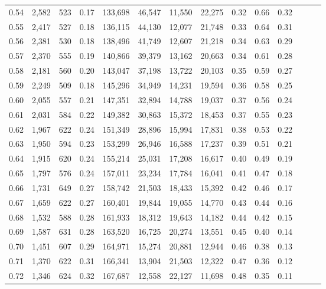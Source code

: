 \begin{tabular}{rrrrrrrrrrrrrr}
0.54 &  2,582 &  523 &  0.17 &  133,698 &   46,547 &  11,550 &  22,275 &  0.32 &  0.66 &      0.32 \\
0.55 &  2,417 &  527 &  0.18 &  136,115 &   44,130 &  12,077 &  21,748 &  0.33 &  0.64 &      0.31 \\
0.56 &  2,381 &  530 &  0.18 &  138,496 &   41,749 &  12,607 &  21,218 &  0.34 &  0.63 &      0.29 \\
0.57 &  2,370 &  555 &  0.19 &  140,866 &   39,379 &  13,162 &  20,663 &  0.34 &  0.61 &      0.28 \\
0.58 &  2,181 &  560 &  0.20 &  143,047 &   37,198 &  13,722 &  20,103 &  0.35 &  0.59 &      0.27 \\
0.59 &  2,249 &  509 &  0.18 &  145,296 &   34,949 &  14,231 &  19,594 &  0.36 &  0.58 &      0.25 \\
0.60 &  2,055 &  557 &  0.21 &  147,351 &   32,894 &  14,788 &  19,037 &  0.37 &  0.56 &      0.24 \\
0.61 &  2,031 &  584 &  0.22 &  149,382 &   30,863 &  15,372 &  18,453 &  0.37 &  0.55 &      0.23 \\
0.62 &  1,967 &  622 &  0.24 &  151,349 &   28,896 &  15,994 &  17,831 &  0.38 &  0.53 &      0.22 \\
0.63 &  1,950 &  594 &  0.23 &  153,299 &   26,946 &  16,588 &  17,237 &  0.39 &  0.51 &      0.21 \\
0.64 &  1,915 &  620 &  0.24 &  155,214 &   25,031 &  17,208 &  16,617 &  0.40 &  0.49 &      0.19 \\
0.65 &  1,797 &  576 &  0.24 &  157,011 &   23,234 &  17,784 &  16,041 &  0.41 &  0.47 &      0.18 \\
0.66 &  1,731 &  649 &  0.27 &  158,742 &   21,503 &  18,433 &  15,392 &  0.42 &  0.46 &      0.17 \\
0.67 &  1,659 &  622 &  0.27 &  160,401 &   19,844 &  19,055 &  14,770 &  0.43 &  0.44 &      0.16 \\
0.68 &  1,532 &  588 &  0.28 &  161,933 &   18,312 &  19,643 &  14,182 &  0.44 &  0.42 &      0.15 \\
0.69 &  1,587 &  631 &  0.28 &  163,520 &   16,725 &  20,274 &  13,551 &  0.45 &  0.40 &      0.14 \\
0.70 &  1,451 &  607 &  0.29 &  164,971 &   15,274 &  20,881 &  12,944 &  0.46 &  0.38 &      0.13 \\
0.71 &  1,370 &  622 &  0.31 &  166,341 &   13,904 &  21,503 &  12,322 &  0.47 &  0.36 &      0.12 \\
0.72 &  1,346 &  624 &  0.32 &  167,687 &   12,558 &  22,127 &  11,698 &  0.48 &  0.35 &      0.11 \\

\end{tabular}
